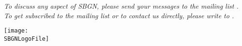 \begin{titlepage}
\begin{center}


\vfill

\normalsize
\begin{minipage}{5in}
  \emph{To discuss any aspect of SBGN, please send your messages
    to the mailing list .  To get
    subscribed to the mailing list or to contact us directly,
    please write to .}
\end{minipage}

\vfill

\centerline{\texttt{[image: \\SBGNLogoFile]}}

\end{center}

\end{titlepage}

%
%

\setcounter{page}{2}
